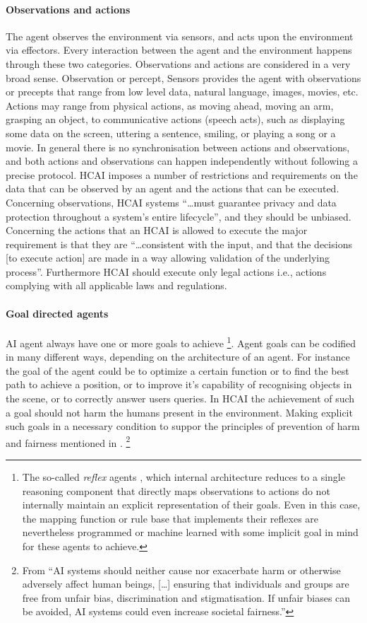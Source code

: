   \paragraph{Observations and actions}
The agent observes the environment via sensors, and acts upon the
environment via effectors. Every interaction between the agent and the
environment happens through these two categories. Observations and
actions are considered in a very broad sense. Observation or percept,
Sensors provides the agent with observations or precepts that range
from low level data, natural language, images, movies, etc.  Actions
may range from physical actions, as moving ahead, moving an arm,
grasping an object, to communicative actions (speech acts), such as
displaying some data on the screen, uttering a sentence, smiling, or
playing a song or a movie. In general there is no synchronisation
between actions and observations, and both actions and observations
can happen independently without following a precise protocol.  HCAI
imposes a number of restrictions and requirements on the data that can
be observed by an agent and the actions that can be
executed. Concerning observations, HCAI systems ``\dots must guarantee
privacy and data protection throughout a system’s entire lifecycle'',
and they should be unbiased. Concerning the actions that an HCAI is
allowed to execute the major requirement is that they are
``\dots consistent with the input, and that the decisions [to execute
action] are made in a way allowing validation of the underlying
process''. Furthermore HCAI should execute only legal actions
i.e., actions complying with all applicable laws and regulations. 

\paragraph{Goal directed agents} 
AI agent always have one or more goals to achieve \footnote{The
  so-called \emph{reflex} agents \cite{aima4}, which internal
  architecture reduces to a single reasoning component that directly
  maps observations to actions do not internally maintain an explicit
  representation of their goals. Even in this case, the mapping
  function or rule base that implements their reflexes are
  nevertheless programmed or machine learned with some implicit goal
  in mind for these agents to achieve.}. Agent goals can be codified
in many different ways, depending on the architecture of an agent. For
instance the goal of the agent could be to optimize a certain function
or to find the best path to achieve a position, or to improve it's
capability of recognising objects in the scene, or to correctly answer
users queries. In HCAI the achievement of such a goal should not harm
the humans present in the environment. Making explicit such goals in a
necessary condition to suppor the principles of prevention of harm and
fairness mentioned in \cite{eu-ethical-guidelines}.  \footnote{From
  \cite[page 12]{eu-ethical-guidelines} ``AI systems should neither
  cause nor exacerbate harm or otherwise adversely affect human
  beings, [\dots] ensuring that individuals and groups are free from
  unfair bias, discrimination and stigmatisation. If unfair biases can
  be avoided, AI systems could even increase societal fairness.''}

